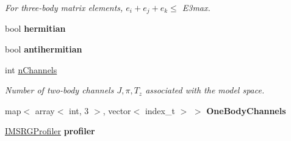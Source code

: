 \begin{DoxyCompactItemize}
\begin{DoxyCompactList}\small\item\em For three-\/body matrix elements, $ e_i + e_j + e_k \leq $ E3max. \end{DoxyCompactList}\item 
bool {\bfseries hermitian}\hypertarget{classOperator_ad46a54204c51cf5c82e4c489217bd2c1}{}\label{classOperator_ad46a54204c51cf5c82e4c489217bd2c1}

\item 
bool {\bfseries antihermitian}\hypertarget{classOperator_a86dd30fca215948dd9307fa45b7a2e32}{}\label{classOperator_a86dd30fca215948dd9307fa45b7a2e32}

\item 
int \hyperlink{classOperator_a710cd3c6107a4497e90a04c1f3d2b15f}{n\+Channels}\hypertarget{classOperator_a710cd3c6107a4497e90a04c1f3d2b15f}{}\label{classOperator_a710cd3c6107a4497e90a04c1f3d2b15f}

\begin{DoxyCompactList}\small\item\em Number of two-\/body channels $ J,\pi,T_z $ associated with the model space. \end{DoxyCompactList}\item 
map$<$ array$<$ int, 3 $>$, vector$<$ index\+\_\+t $>$ $>$ {\bfseries One\+Body\+Channels}\hypertarget{classOperator_a380992b76bd3ef1fc2c6dd7e2debf8ff}{}\label{classOperator_a380992b76bd3ef1fc2c6dd7e2debf8ff}

\item 
\hyperlink{classIMSRGProfiler}{I\+M\+S\+R\+G\+Profiler} {\bfseries profiler}\hypertarget{classOperator_a9bc51c77e4b73736241fd8cedea05cc3}{}\label{classOperator_a9bc51c77e4b73736241fd8cedea05cc3}

\end{DoxyCompactItemize}
